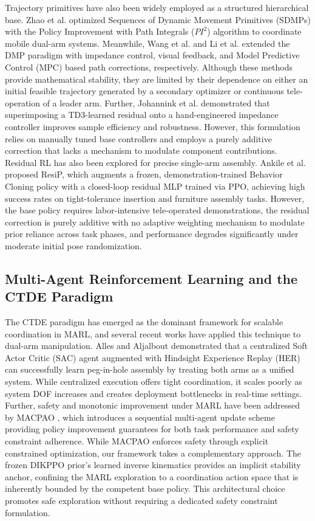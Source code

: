 \documentclass[a4paper,fleqn]{cas-dc}
\begin{document}
Trajectory primitives have also been widely employed as a structured hierarchical base. Zhao et al. \cite{related-40} optimized Sequences of Dynamic Movement Primitives (SDMPs) with the Policy Improvement with Path Integrals ($PI^{2}$) algorithm to coordinate mobile dual-arm systems. Meanwhile, Wang et al. \cite{related-41} and Li et al. \cite{related-42} extended the DMP paradigm with impedance control, visual feedback, and Model Predictive Control (MPC) based path corrections, respectively. Although these methods provide mathematical stability, they are limited by their dependence on either an initial feasible trajectory generated by a secondary optimizer or continuous tele-operation of a leader arm. Further, Johannink et al. \cite{residual} demonstrated that superimposing a TD3-learned residual onto a hand-engineered impedance controller improves sample efficiency and robustness. However, this formulation relies on manually tuned base controllers and employs a purely additive correction that lacks a mechanism to modulate component contributions. Residual RL has also been explored for precise single-arm assembly. Ankile et al. \cite{ResiP} proposed ResiP, which augments a frozen, demonstration-trained Behavior Cloning policy with a closed-loop residual MLP trained via PPO, achieving high success rates on tight-tolerance insertion and furniture assembly tasks. However, the base policy requires labor-intensive tele-operated demonstrations, the residual correction is purely additive with no adaptive weighting mechanism to modulate prior reliance across task phases, and performance degrades significantly under moderate initial pose randomization. 

\subsection{Multi-Agent Reinforcement Learning and the CTDE Paradigm}
The CTDE paradigm has emerged as the dominant framework for scalable coordination in MARL, and several recent works have applied this technique to dual-arm manipulation. Alles and Aljalbout \cite{related-43} demonstrated that a centralized Soft Actor Critic (SAC) agent augmented with Hindsight Experience Replay (HER) can successfully learn peg-in-hole assembly by treating both arms as a unified system. While centralized execution offers tight coordination, it scales poorly as system DOF increases and creates deployment bottlenecks in real-time settings. Further, safety and monotonic improvement under MARL have been addressed by MACPAO \cite{related-44}, which introduces a sequential multi-agent update scheme providing policy improvement guarantees for both task performance and safety constraint adherence. While MACPAO enforces safety through explicit constrained optimization, our framework takes a complementary approach. The frozen DIKPPO prior's learned inverse kinematics provides an implicit stability anchor, confining the MARL exploration to a coordination action space that is inherently bounded by the competent base policy. This architectural choice promotes safe exploration without requiring a dedicated safety constraint formulation.
\end{document}

